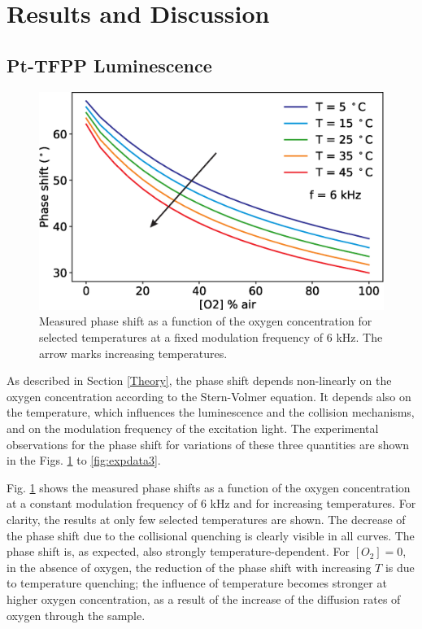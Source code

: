 \documentclass[sensors,article,submit,moreauthors,pdftex,10pt,a4paper]{Definitions/mdpi}
\begin{document}
\section{Results and Discussion}
\label{Results}

\subsection{Pt-TFPP Luminescence}

\begin{figure}[htb]
\centering
\includegraphics[width=8.2 cm]{phase_O2_T.eps}
\caption{Measured phase shift as a function of the oxygen concentration for selected temperatures at a fixed modulation frequency of 6 kHz. The arrow marks increasing temperatures.}
\label{fig:expdata1}
\end{figure}

As described in Section \ref{Theory}, the phase shift depends non-linearly on the oxygen concentration according to the Stern-Volmer equation. It depends also on the temperature, which influences the luminescence and the collision mechanisms, and on the modulation frequency of the excitation light. The experimental observations for the phase shift for variations of these three quantities are shown in the Figs. \ref{fig:expdata1} to \ref{fig:expdata3}.

Fig. \ref{fig:expdata1} shows the measured phase shifts as a function of the oxygen concentration at a constant modulation frequency of 6 kHz and for increasing temperatures. For clarity, the results at only few selected temperatures are shown. The decrease of the phase shift due to the collisional quenching is clearly visible in all curves. The phase shift is, as expected, also strongly  temperature-dependent. For $[O_2]=0$, in the absence of oxygen, the reduction of the phase shift with increasing $T$ is due to temperature quenching; the influence of temperature becomes stronger at higher oxygen concentration, as a result of the increase of the diffusion rates of oxygen through the sample.
\end{document}
